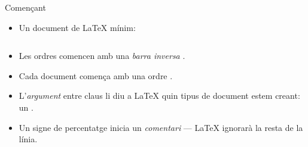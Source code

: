 


\begin{frame}[fragile]{Començant}
\begin{itemize}
\item Un document de \LaTeX{} mínim:
\inputminted[frame=single]{latex}{basics.tex}
\item Les ordres comencen amb una \emph{barra inversa} \keystrokebftt{\bs}.
\item Cada document comença amb una ordre .
\item L'\emph{argument} entre claus \keystrokebftt{\{} \keystrokebftt{\}} li diu a \LaTeX{} quin tipus de document estem creant: un .
\item Un signe de percentatge \keystrokebftt{\%} inicia un \emph{comentari} --- \LaTeX{}
 ignorarà la resta de la línia.
\end{itemize}
\end{frame}

